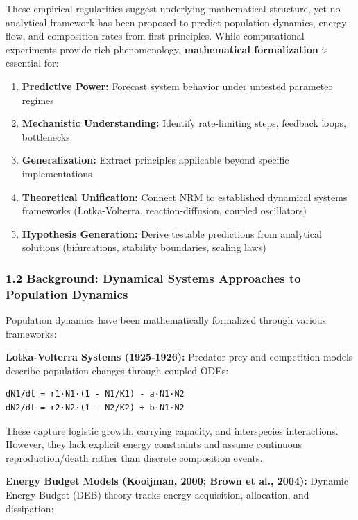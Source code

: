 \documentclass[
]{article}
\providecommand{\tightlist}{%
  \setlength{\itemsep}{0pt}\setlength{\parskip}{0pt}}
\begin{document}
These empirical regularities suggest underlying mathematical structure,
yet no analytical framework has been proposed to predict population
dynamics, energy flow, and composition rates from first principles.
While computational experiments provide rich phenomenology,
\textbf{mathematical formalization} is essential for:

\begin{enumerate}
\def\labelenumi{\arabic{enumi}.}
\tightlist
\item
  \textbf{Predictive Power:} Forecast system behavior under untested
  parameter regimes
\item
  \textbf{Mechanistic Understanding:} Identify rate-limiting steps,
  feedback loops, bottlenecks
\item
  \textbf{Generalization:} Extract principles applicable beyond specific
  implementations
\item
  \textbf{Theoretical Unification:} Connect NRM to established dynamical
  systems frameworks (Lotka-Volterra, reaction-diffusion, coupled
  oscillators)
\item
  \textbf{Hypothesis Generation:} Derive testable predictions from
  analytical solutions (bifurcations, stability boundaries, scaling
  laws)
\end{enumerate}

\subsubsection{1.2 Background: Dynamical Systems Approaches to
Population
Dynamics}\label{background-dynamical-systems-approaches-to-population-dynamics}

Population dynamics have been mathematically formalized through various
frameworks:

\textbf{Lotka-Volterra Systems (1925-1926):} Predator-prey and
competition models describe population changes through coupled ODEs:

\begin{verbatim}
dN1/dt = r1·N1·(1 - N1/K1) - a·N1·N2
dN2/dt = r2·N2·(1 - N2/K2) + b·N1·N2
\end{verbatim}

These capture logistic growth, carrying capacity, and interspecies
interactions. However, they lack explicit energy constraints and assume
continuous reproduction/death rather than discrete composition events.

\textbf{Energy Budget Models (Kooijman, 2000; Brown et al., 2004):}
Dynamic Energy Budget (DEB) theory tracks energy acquisition,
allocation, and dissipation:
\end{document}

